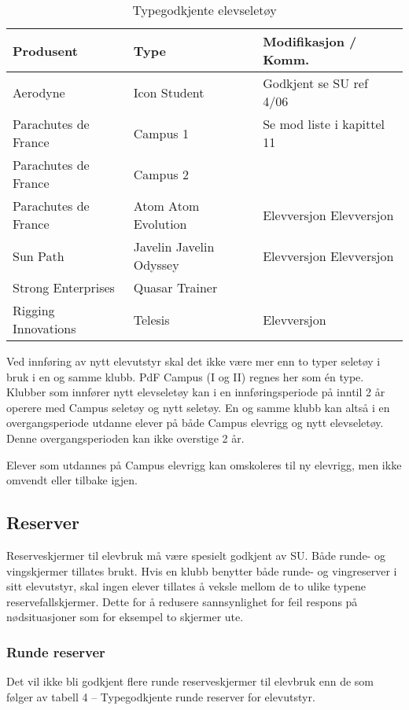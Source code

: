 \begin{table}
	\caption{Typegodkjente elevseletøy}
	\begin{tabular}{ | p{3cm} | p{3cm} | p{4cm} | }
		\hline
		Produsent & Type & Modifikasjon / Komm. \\
		\hline
		Aerodyne & Icon Student & Godkjent se SU ref 4/06 \\
		\hline
		Parachutes de France & Campus 1 & Se mod liste i kapittel 11 \\
		\hline
		Parachutes de France & Campus 2 & \\
		\hline
		Parachutes de France & Atom Atom Evolution & Elevversjon Elevversjon \\
		\hline
		Sun Path & Javelin Javelin Odyssey & Elevversjon Elevversjon \\
		\hline
		Strong Enterprises & Quasar Trainer & \\
		\hline
		Rigging Innovations & Telesis & Elevversjon \\
		\hline
	\end{tabular}
\end{table}

Ved innføring av nytt elevutstyr skal det ikke være mer enn to typer seletøy i bruk i en og samme klubb. PdF Campus (I og II) regnes her som én type. Klubber som innfører nytt elevseletøy kan i en innføringsperiode på inntil 2 år operere med Campus seletøy og nytt seletøy. En og samme klubb kan altså i en overgangsperiode utdanne elever på både Campus elevrigg og nytt elevseletøy. Denne overgangsperioden kan ikke overstige 2 år.

Elever som utdannes på Campus elevrigg kan omskoleres til ny elevrigg, men ikke omvendt eller tilbake igjen.

\subsection{Reserver}
Reserveskjermer til elevbruk må være spesielt godkjent av SU. Både runde- og vingskjermer tillates brukt. Hvis en klubb benytter både runde- og vingreserver i sitt elevutstyr, skal ingen elever tillates å veksle mellom de to ulike typene reservefallskjermer. Dette for å redusere sannsynlighet for feil respons på nødsituasjoner som for eksempel to skjermer ute.

\subsubsection{Runde reserver}
Det vil ikke bli godkjent flere runde reserveskjermer til elevbruk enn de som følger av tabell 4 – Typegodkjente runde reserver for elevutstyr.

